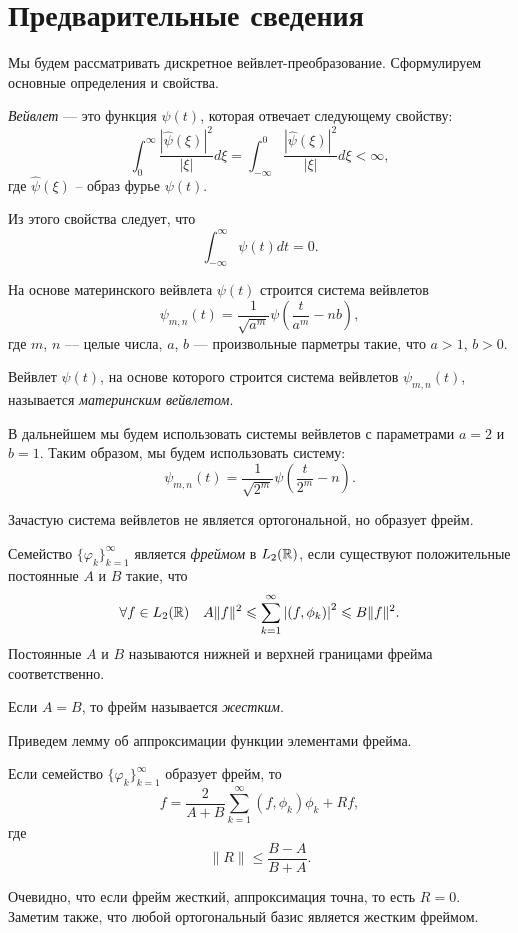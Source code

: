 \documentclass[../paper.tex]{subfiles}
\begin{document}
\section{Предварительные сведения}
Мы будем рассматривать дискретное вейвлет-преобразование. Сформулируем основные определения и свойства.
\begin{Def}
	\emph{Вейвлет} --- это функция $\psi(t)$, которая отвечает следующему свойству:
	\[
		\int_0^\infty \frac{ \left|\hat{\psi}(\xi)\right|^2 }{\left|\xi\right|} d \xi
		= \int_{-\infty}^0 \frac{ \left|\hat{\psi}(\xi)\right|^2 }{\left|\xi\right|} d \xi
		< \infty
	,\] где $\hat{\psi}(\xi)$ -- образ фурье $\psi(t)$.
\end{Def}

Из этого свойства следует, что
\[
	\int_{-\infty}^{\infty} \psi(t) dt = 0
.\]

На основе материнского вейвлета $\psi(t)$ строится система вейвлетов
\[
	\psi_{m,n}(t) = \frac{1}{\sqrt{a^m}} \psi\left(\frac{t}{a^m} - n b\right)
,\]
где $m$, $n$ --- целые числа, $a$, $b$ --- произвольные парметры такие, что $a > 1$, $b > 0$.

Вейвлет $\psi(t)$, на основе которого строится система вейвлетов $\psi_{m,n}(t)$, называется \emph{материнским вейвлетом}.

В дальнейшем мы будем использовать системы вейвлетов с параметрами $a=2$ и $b=1$.
Таким образом, мы будем использовать систему:
\[
	\psi_{m,n}(t) = \frac{1}{\sqrt{2^m}} \psi\left(\frac{t}{2^m} - n\right)
.\]

Зачастую система вейвлетов не является ортогональной, но образует фрейм.
\begin{Def}
	Семейство $\{\varphi_k\}_{k=1}^\infty$ является \emph{фреймом} в $L_2(\mathbb{R})$, если существуют положительные постоянные $A$ и $B$ такие, что
	\[
		\forall f \in L_2(\mathbb{R}) \quad A \|f\|^2 \leqslant \sum_{k=1}^\infty \left|\left(f, \phi_k\right)\right|^2 \leqslant B \|f\|^2
	.\]
	Постоянные $A$ и $B$ называются нижней и верхней границами фрейма соответственно.

	Если $A = B$, то фрейм называется \emph{жестким}.
\end{Def}

Приведем лемму об аппроксимации функции элементами фрейма.
\begin{Lem}
	Если семейство $\{\varphi_k\}_{k=1}^\infty$ образует фрейм, то
	\[
		f = \frac{2}{A+B} \sum_{k=1}^\infty \left(f, \phi_k\right)\phi_k + Rf
	,\] где \[
		\|R\| \leqslant \frac{B-A}{B+A}
	.\]
\end{Lem}
Очевидно, что если фрейм жесткий, аппроксимация точна, то есть $R = 0$.
Заметим также, что любой ортогональный базис является жестким фреймом.
\end{document}
